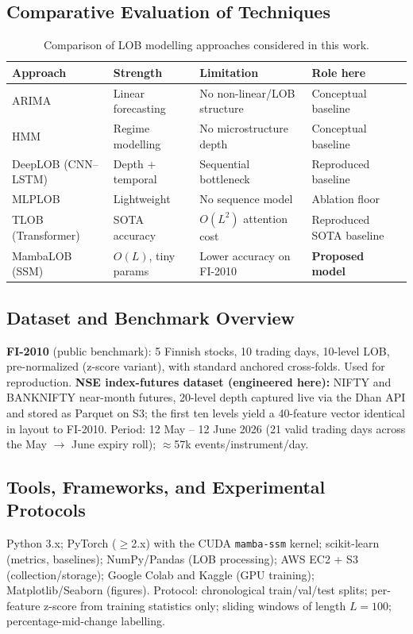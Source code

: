 \documentclass[11pt]{article}
\begin{document}
\subsection{Comparative Evaluation of Techniques}
\begin{table}[h]
\centering
\caption{Comparison of LOB modelling approaches considered in this work.}
\begin{tabular}{@{}llll@{}}
\toprule
\textbf{Approach} & \textbf{Strength} & \textbf{Limitation} & \textbf{Role here} \\
\midrule
ARIMA & Linear forecasting & No non-linear/LOB structure & Conceptual baseline \\
HMM & Regime modelling & No microstructure depth & Conceptual baseline \\
DeepLOB (CNN--LSTM) & Depth + temporal & Sequential bottleneck & Reproduced baseline \\
MLPLOB & Lightweight & No sequence model & Ablation floor \\
TLOB (Transformer) & SOTA accuracy & $O(L^2)$ attention cost & Reproduced SOTA baseline \\
MambaLOB (SSM) & $O(L)$, tiny params & Lower accuracy on FI-2010 & \textbf{Proposed model} \\
\bottomrule
\end{tabular}
\end{table}

\subsection{Dataset and Benchmark Overview}
\textbf{FI-2010} (public benchmark): 5 Finnish stocks, 10 trading days, 10-level LOB, pre-normalized
(z-score variant), with standard anchored cross-folds. Used for reproduction.
\textbf{NSE index-futures dataset (engineered here):} NIFTY and BANKNIFTY near-month futures, 20-level depth
captured live via the Dhan API and stored as Parquet on S3; the first ten levels yield a 40-feature vector
identical in layout to FI-2010. Period: 12 May -- 12 June 2026 (21 valid trading days across the May
$\rightarrow$ June expiry roll); $\approx$57k events/instrument/day.

\subsection{Tools, Frameworks, and Experimental Protocols}
Python 3.x; PyTorch ($\geq$2.x) with the CUDA \texttt{mamba-ssm} kernel; scikit-learn (metrics, baselines);
NumPy/Pandas (LOB processing); AWS EC2 + S3 (collection/storage); Google Colab and Kaggle (GPU training);
Matplotlib/Seaborn (figures). Protocol: chronological train/val/test splits; per-feature z-score from
training statistics only; sliding windows of length $L=100$; percentage-mid-change labelling.
\end{document}
